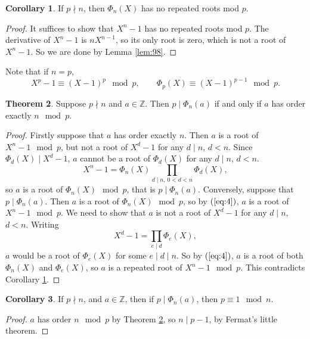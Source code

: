 \documentclass{article}
\newcommand{\Z}{\mathbb{Z}}
\newcommand{\rb}[1]{\left( #1 \right)}
\theoremstyle{definition}\newtheorem{definition}{Definition}
\theoremstyle{definition}\newtheorem{remark}[definition]{Remark}
\theoremstyle{definition}\newtheorem*{example}{Example}
\theoremstyle{definition}\newtheorem*{note}{Note}
\newtheorem{theorem}[definition]{Theorem}
\newtheorem{corollary}[definition]{Corollary}
\begin{document}
\begin{corollary}
\label{cor:99}
If $ p \nmid n $, then $ \Phi_n\rb{X} $ has no repeated roots mod $ p $.
\end{corollary}

\begin{proof}
It suffices to show that $ X^n - 1 $ has no repeated roots mod $ p $. The derivative of $ X^n - 1 $ is $ nX^{n - 1} $, so its only root is zero, which is not a root of $ X^n - 1 $. So we are done by Lemma \ref{lem:98}.
\end{proof}

Note that if $ n = p $,
$$ X^p - 1 \equiv \rb{X - 1}^p \mod p, \qquad \Phi_p\rb{X} \equiv \rb{X - 1}^{p - 1} \mod p. $$

\begin{theorem}
\label{thm:100}
Suppose $ p \nmid n $ and $ a \in \Z $. Then $ p \mid \Phi_n\rb{a} $ if and only if $ a $ has order exactly $ n \mod p $.
\end{theorem}

\begin{proof}
Firstly suppose that $ a $ has order exactly $ n $. Then $ a $ is a root of $ X^n - 1 \mod p $, but not a root of $ X^d - 1 $ for any $ d \mid n $, $ d < n $. Since $ \Phi_d\rb{X} \mid X^d - 1 $, $ a $ cannot be a root of $ \Phi_d\rb{X} $ for any $ d \mid n $, $ d < n $.
\begin{equation}
\label{eq:4}
X^n - 1 = \Phi_n\rb{X}\prod_{d \mid n, \ 0 < d < n} \Phi_d\rb{X},
\end{equation}
so $ a $ is a root of $ \Phi_n\rb{X} \mod p $, that is $ p \mid \Phi_n\rb{a} $. Conversely, suppose that $ p \mid \Phi_n\rb{a} $. Then $ a $ is a root of $ \Phi_n\rb{X} \mod p $, so by $ \rb{\ref{eq:4}} $, $ a $ is a root of $ X^n - 1 \mod p $. We need to show that $ a $ is not a root of $ X^d - 1 $ for any $ d \mid n $, $ d < n $. Writing
$$ X^d - 1 = \prod_{e \mid d} \Phi_e\rb{X}, $$
$ a $ would be a root of $ \Phi_e\rb{X} $ for some $ e \mid d \mid n $. So by $ \rb{\ref{eq:4}} $, $ a $ is a root of both $ \Phi_n\rb{X} $ and $ \Phi_e\rb{X} $, so $ a $ is a repeated root of $ X^n - 1 \mod p $. This contradicts Corollary \ref{cor:99}.
\end{proof}

\begin{corollary}
\label{cor:101}
If $ p \nmid n $, and $ a \in \Z $, then if $ p \mid \Phi_n\rb{a} $, then $ p \equiv 1 \mod n $.
\end{corollary}

\begin{proof}
$ a $ has order $ n \mod p $ by Theorem \ref{thm:100}, so $ n \mid p - 1 $, by Fermat's little theorem.
\end{proof}
\end{document}
